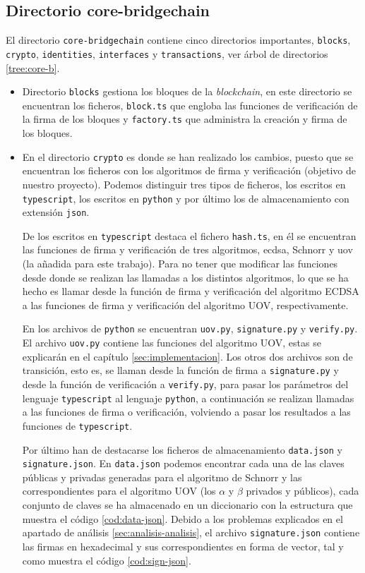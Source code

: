 \subsection{Directorio core-bridgechain}

El directorio \texttt{core-bridgechain} contiene cinco directorios importantes, \texttt{blocks}, \texttt{crypto}, \texttt{identities}, \texttt{interfaces} y \texttt{transactions}, ver árbol de directorios \ref{tree:core-b}.

\begin{itemize}
	\item Directorio \texttt{blocks} gestiona los bloques de la \textit{blockchain}, en este directorio se encuentran los ficheros, \texttt{block.ts} que engloba las funciones de verificación de la firma de los bloques y \texttt{factory.ts} que administra la creación y firma de los bloques.
	\item En el directorio \texttt{crypto} es donde se han realizado los cambios, puesto que se encuentran los ficheros con los algoritmos de firma y verificación (objetivo de nuestro proyecto). Podemos distinguir tres tipos de ficheros, los escritos en \texttt{typescript}, los escritos en \texttt{python} y por último los de almacenamiento con extensión \texttt{json}.
	
	De los escritos en \texttt{typescript} destaca el fichero \texttt{hash.ts}, en él se encuentran las funciones de firma y verificación de tres algoritmos, \acrshort{ecdsa}, Schnorr\cite{schnorr} y \acrshort{uov} (la añadida para este trabajo). Para no tener que modificar las funciones desde donde se realizan las llamadas a los distintos algoritmos, lo que se ha hecho es llamar desde la función de firma y verificación del algoritmo ECDSA a las funciones de firma y verificación del algoritmo UOV, respectivamente.
	
	En los archivos de \texttt{python} se encuentran \texttt{uov.py}, \texttt{signature.py} y \texttt{verify.py}. El archivo \texttt{uov.py} contiene las funciones del algoritmo UOV, estas se explicarán en el capítulo \ref{sec:implementacion}. Los otros dos archivos son de transición, esto es, se llaman desde la función de firma a \texttt{signature.py} y desde la función de verificación a \texttt{verify.py}, para pasar los parámetros del lenguaje \texttt{typescript} al lenguaje \texttt{python}, a continuación se realizan llamadas a las funciones de firma o verificación, volviendo a pasar los resultados a las funciones de \texttt{typescript}.
	
	Por último han de destacarse los ficheros de almacenamiento \texttt{data.json} y \texttt{signature.json}. En \texttt{data.json} podemos encontrar cada una de las claves públicas y privadas generadas para el algoritmo de Schnorr y las correspondientes para el algoritmo UOV (los $\alpha$ y $\beta$ privados y públicos), cada conjunto de claves se ha almacenado en un diccionario con la estructura que muestra el código \ref{cod:data-json}. Debido a los problemas explicados en el apartado de análisis \ref{sec:analisis-analisis}, el archivo \texttt{signature.json} contiene las firmas en hexadecimal y sus correspondientes en forma de vector, tal y como muestra el código \ref{cod:sign-json}.
	

\end{itemize}
